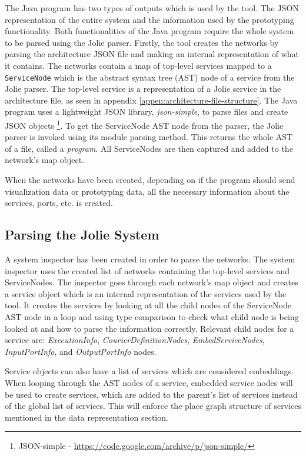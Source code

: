 The Java program has two types of outputs which is used by the tool. The JSON representation of the entire system and the information used by the prototyping functionality. Both functionalities of the Java program require the whole system to be parsed using the Jolie parser.
Firstly, the tool creates the networks by parsing the architecture JSON file and making an internal representation of what it contains. The networks contain a map of top-level services mapped to a \texttt{ServiceNode} which is the abstract syntax tree (AST) node of a service from the Jolie parser. The top-level service is a representation of a Jolie service in the architecture file, as seen in appendix \ref*{appen:architecture-file-structure}.
The Java program uses a lightweight JSON library, \textit{json-simple}, to parse files and create JSON objects \footnote{JSON-simple - \url{https://code.google.com/archive/p/json-simple/}}.
To get the ServiceNode AST node from the parser, the Jolie parser is invoked using its module parsing method. This returns the whole AST of a file, called a \textit{program}. All ServiceNodes are then captured and added to the network's map object.

When the networks have been created, depending on if the program should send visualization data or prototyping data, all the necessary information about the services, ports, etc. is created.
\subsection{Parsing the Jolie System}
A system inspector has been created in order to parse the networks.
The system inspector uses the created list of networks containing the top-level services and ServiceNodes.
The inspector goes through each network's map object and creates a service object which is an internal representation of the services used by the tool.
It creates the services by looking at all the child nodes of the ServiceNode AST node in a loop and using type comparison to check what child node is being looked at and how to parse the information correctly.
Relevant child nodes for a service are: \textit{ExecutionInfo}, \textit{CourierDefinitionNodes}, \textit{EmbedServiceNodes}, \textit{InputPortInfo}, and \textit{OutputPortInfo} nodes.

Service objects can also have a list of services which are considered embeddings. When looping through the AST nodes of a service, embedded service nodes will be used to create services, which are added to the parent's list of services instead of the global list of services.
This will enforce the place graph structure of services mentioned in the data representation section.

